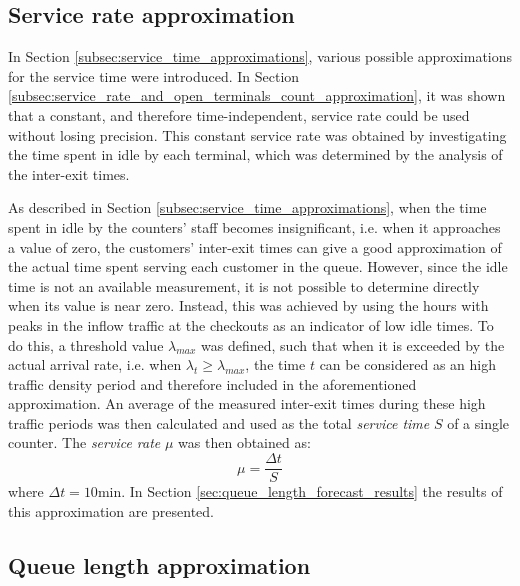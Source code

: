 \subsection{Service rate approximation}
\label{subsec:service_rate_approximation}

In Section \ref{subsec:service_time_approximations}, various possible approximations for the service time were introduced. In Section \ref{subsec:service_rate_and_open_terminals_count_approximation}, it was shown that a constant, and therefore time-independent, service rate could be used without losing precision. This constant service rate was obtained by investigating the time spent in idle by each terminal, which was determined by the analysis of the inter-exit times.

As described in Section \ref{subsec:service_time_approximations}, when the time spent in idle by the counters’ staff becomes insignificant, i.e. when it approaches a value of zero, the customers’ inter-exit times can give a good approximation of the actual time spent serving each customer in the queue. However, since the idle time is not an available measurement, it is not possible to determine directly when its value is near zero. Instead, this was achieved by using the hours with peaks in the inflow traffic at the checkouts as an indicator of low idle times. To do this, a threshold value \( \lambda_{max} \) was defined, such that when it is exceeded by the actual arrival rate, i.e. when \( \lambda_t \ge \lambda_{max} \), the time \( t \) can be considered as an high traffic density period and therefore included in the aforementioned approximation. An average of the measured inter-exit times during these high traffic periods was then calculated and used as the total \emph{service time} \( S \) of a single counter. The \emph{service rate} \( \mu \) was then obtained as:
\begin{equation}
  \mu = \frac{\Delta t}{S}
\end{equation}
where \( \Delta t = 10\text{min} \). In Section \ref{sec:queue_length_forecast_results} the results of this approximation are presented.

\subsection{Queue length approximation}
\label{subsec:queue_length_approximation}

